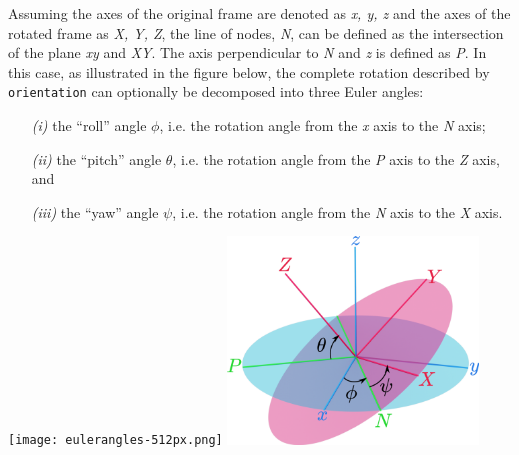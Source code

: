 \begin{cvcoptions}
\item %
\item %
\item %
\item %
\end{cvcoptions}



Assuming the axes of the original frame are denoted as \textit{x, y, z} and the 
axes of the rotated frame as \textit{X, Y, Z}, the line of nodes, \textit{N}, 
can be defined as the intersection of the plane \textit{xy} and \textit{XY}. 
The axis perpendicular to \textit{N} and \textit{z} is defined as \textit{P}. 
In this case, as illustrated in the figure below, the complete 
rotation described by \texttt{orientation} can optionally be decomposed into 
three Euler angles:
\begin{itemize}
\item[\emph{(i)}] the ``roll'' angle $\phi$, i.e.{} the rotation angle from the \textit{x} axis to the \textit{N} axis;
\item[\emph{(ii)}] the ``pitch'' angle $\theta$, i.e.{} the rotation angle from 
the \textit{P} axis to the \textit{Z} axis, and
\item[\emph{(iii)}] the ``yaw'' angle $\psi$, i.e.{} the rotation angle from the \textit{N} axis to the \textit{X} axis.
\end{itemize}

\begin{center}
\ifdefined\HCode
\texttt{[image: eulerangles-512px.png]}
\else
\includegraphics[width=0.5\textwidth]{eulerangles.pdf}
\fi
\end{center}

